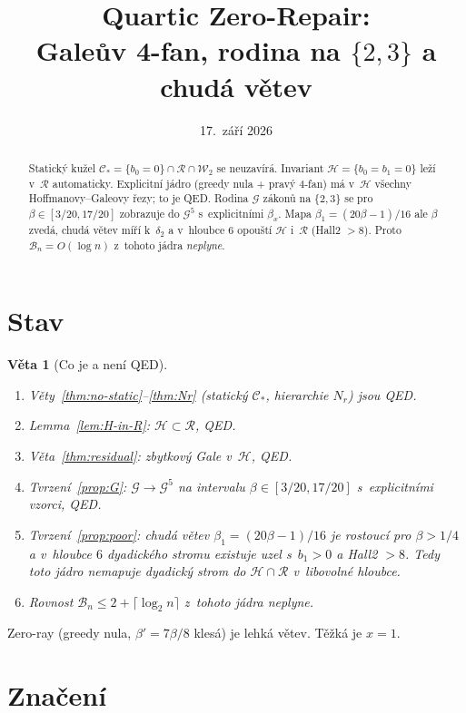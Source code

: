 \documentclass[11pt,a4paper]{article}
\title{Quartic Zero-Repair:\\Galeův 4-fan, rodina na \(\{2,3\}\) a chudá větev}
\author{}
\date{17.~září 2026}
\newtheorem{theorem}{Věta}[section]
\theoremstyle{definition}
\theoremstyle{remark}
\newcommand{\cB}{\mathcal B}
\newcommand{\cC}{\mathcal C}
\newcommand{\cG}{\mathcal G}
\newcommand{\cH}{\mathcal H}
\newcommand{\cR}{\mathcal R}
\newcommand{\cW}{\mathcal W}
\begin{document}
\maketitle

\begin{abstract}
Statický kužel \(\cC_\ast=\{b_0=0\}\cap\cR\cap\cW_2\) se neuzavírá.
Invariant \(\cH=\{b_0=b_1=0\}\) leží v~\(\cR\) automaticky.
Explicitní jádro (greedy nula + pravý 4-fan) má v~\(\cH\) všechny Hoffmanovy--Galeovy řezy;
to je QED. Rodina \(\cG\) zákonů na \(\{2,3\}\) se pro \(\beta\in[3/20,17/20]\)
zobrazuje do \(\cG^5\) s~explicitními \(\beta_x\).
Mapa \(\beta_1=(20\beta-1)/16\) ale \(\beta\) zvedá, chudá větev míří k~\(\delta_2\)
a v~hloubce \(6\) opouští \(\cH\) i~\(\cR\) (Hall2 \(>8\)).
Proto \(\cB_n=O(\log n)\) z~tohoto jádra \emph{neplyne}.
\end{abstract}

\tableofcontents

\section{Stav}

\begin{theorem}[Co je a není QED]
\label{thm:status}
\begin{enumerate}[leftmargin=1.4em]
\item Věty~\ref{thm:no-static}--\ref{thm:Nr} (statický \(\cC_\ast\), hierarchie \(N_r\)) jsou QED.
\item Lemma~\ref{lem:H-in-R}: \(\cH\subset\cR\), QED.
\item Věta~\ref{thm:residual}: zbytkový Gale v~\(\cH\), QED.
\item Tvrzení~\ref{prop:G}: \(\cG\to\cG^5\) na intervalu \(\beta\in[3/20,17/20]\) s~explicitními vzorci, QED.
\item Tvrzení~\ref{prop:poor}: chudá větev \(\beta_1=(20\beta-1)/16\) je rostoucí pro \(\beta>1/4\)
      a v~hloubce \(6\) dyadického stromu existuje uzel s~\(b_1>0\) a Hall2 \(>8\). Tedy toto jádro
      \emph{nemapuje} dyadický strom do \(\cH\cap\cR\) v~libovolné hloubce.
\item Rovnost \(\cB_n\le 2+\lceil\log_2 n\rceil\) z~tohoto jádra neplyne.
\end{enumerate}
\end{theorem}

Zero-ray (greedy nula, \(\beta'=7\beta/8\) klesá) je lehká větev. Těžká je \(x=1\).

\section{Značení}
\end{document}
